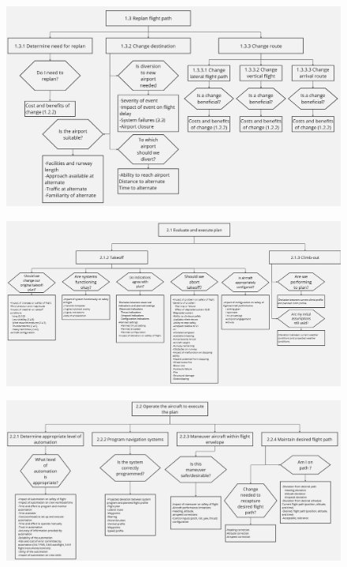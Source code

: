 \documentclass[12pt,a4paper]{article} %
\begin{document}
	\begin{figure}[H]
		\centering
		\includegraphics[width=1.0\textwidth]{./images/GDTA/bott-goal-3.jpg}
		\label{gdta:bott-3}
	\end{figure}

	\begin{figure}[H]
		\centering
		\includegraphics[width=1.0\textwidth]{./images/GDTA/bott-goal-4.jpg}
		\label{gdta:bott-4}
	\end{figure}

	\begin{figure}[H]
		\centering
		\includegraphics[width=1.0\textwidth]{./images/GDTA/bott-goal-5.jpg}
		\label{gdta:bott-5}
	\end{figure}
\end{document}
